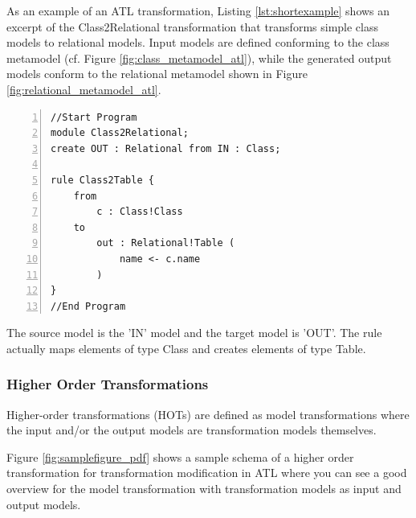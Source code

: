 \documentclass{llncs}
\begin{document}
As an example of an ATL transformation, Listing \ref{lst:shortexample} shows an
excerpt of the Class2Relational transformation that transforms simple class models to
relational models. Input models are defined conforming to the class metamodel
(cf. Figure \ref{fig:class_metamodel_atl}), while the generated output models
conform to the relational metamodel shown in Figure \ref{fig:relational_metamodel_atl}.

\begin{lstlisting}[language=ATL, numbers=left,xleftmargin=5.0ex, caption=Simple example for a ATL transformation, label=lst:shortexample]
//Start Program
module Class2Relational;
create OUT : Relational from IN : Class;

rule Class2Table {
	from
		c : Class!Class
	to 
		out : Relational!Table (
			name <- c.name
		)
}
//End Program
\end{lstlisting}

The source model is the 'IN' model and the target model is 'OUT'. The rule actually maps elements of type Class and creates elements of type Table.

\subsubsection{Higher Order Transformations}

Higher-order transformations (HOTs) are defined as model transformations where the input and/or the output models are transformation models themselves.\cite{Tisi:2009}

Figure \ref{fig:samplefigure_pdf} shows a sample schema of a higher order transformation for transformation modification
in ATL where you can see a good overview for the model transformation with transformation models as input and output models.
\end{document}
